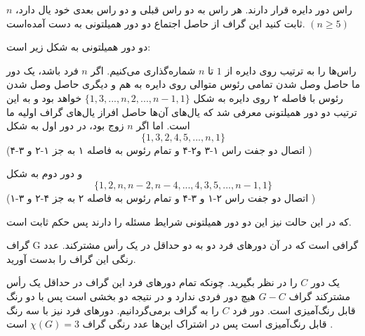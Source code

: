 \documentclass[11pt,largemargins]{h2wp}
\begin{document}
\question

    $n$
     راس دور دایره قرار دارند. هر راس به دو راس قبلی و دو راس بعدی خود یال دارد، ثابت کنید این گراف  از حاصل اجتماع دو دور همیلتونی به دست آمده‌است. $(n \geq 5)$
   
\solution
دو دور همیلتونی به شکل زیر است:

\notes




    راس‌ها را به ترتیب روی دایره از $1$ تا $n$ شماره‌گذاری می‌کنیم. اگر $n$ فرد باشد، یک دور ما حاصل وصل شدن تمامی رئوس متوالی روی دایره به هم و دیگری حاصل وصل شدن رئوس با فاصله ۲ روی دایره به شکل
    $\{1, 3, ..., n, 2, ..., n-1, 1\}$
   خواهد بود و به این ترتیب دو دور همیلتونی  معرفی شد که یال‌های آن‌ها حاصل افراز یال‌های گراف اولیه ما است. اما اگر $n$ زوج بود، در دور اول به شکل
    \[\{1, 3, 2, 4, 5, ..., n, 1\}\]
    (اتصال دو جفت راس ۱-۳ و۲-۴ و تمام رئوس به فاصله ۱ به جز ۱-۲ و ۳-۴ )
    
    و دور دوم به شکل
    \[\{1, 2, n, n-2, n-4, ..., 4, 3, 5, ..., n-1, 1\}\]
     (اتصال دو جفت راس ۲-۱ و ۳-۴ و تمام رئوس به فاصله ۲ به جز ۴-۲ و ۳-۱ )
     
    که در این حالت نیز این دو دور همیلتونی شرایط مسئله را دارند پس حکم ثابت است.
 
 \question
 
			گراف G گرافی است که در آن دور‌های فرد دو به دو حداقل در یک رأس مشترکند. عدد رنگی این گراف را بدست آورید.

\solution

یک دور $C$ را در نظر بگیرید. چونکه تمام دورهای فرد این گراف در حداقل یک رأس مشترکند گراف $G-C$ هیچ دور فردی ندارد و در نتیجه دو بخشی است پس با دو رنگ قابل رنگ‌آمیزی است.
دور فرد $C$ را به گراف برمی‌گردانیم. دورهای فرد نیز با سه رنگ قابل رنگ‌آمیزی است
 پس در اشتراک این‌ها عدد رنگی گراف
 $\chi (G) = 3$ 
 است
.


\notes
\end{document}
